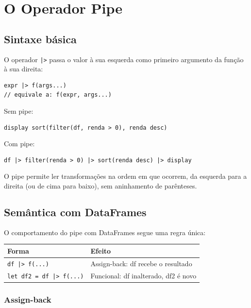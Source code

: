 \chapter{O Operador Pipe}
\label{cap:pipes}

\section{Sintaxe básica}

O operador \lstinline{|>} passa o valor à sua esquerda como primeiro argumento da
função à sua direita:

\begin{lstlisting}
expr |> f(args...)
// equivale a: f(expr, args...)
\end{lstlisting}

Sem pipe:
\begin{lstlisting}
display sort(filter(df, renda > 0), renda desc)
\end{lstlisting}

Com pipe:
\begin{lstlisting}
df |> filter(renda > 0) |> sort(renda desc) |> display
\end{lstlisting}

O pipe permite ler transformações na ordem em que ocorrem, da esquerda para a
direita (ou de cima para baixo), sem aninhamento de parênteses.

\section{Semântica com DataFrames}

O comportamento do pipe com DataFrames segue uma regra única:

\begin{center}
\begin{tabular}{ll}
\toprule
\textbf{Forma} & \textbf{Efeito} \\
\midrule
\texttt{df |> f(...)}          & Assign-back: df recebe o resultado \\
\texttt{let df2 = df |> f(...)} & Funcional: df inalterado, df2 é novo \\
\bottomrule
\end{tabular}
\end{center}

\subsection*{Assign-back}

